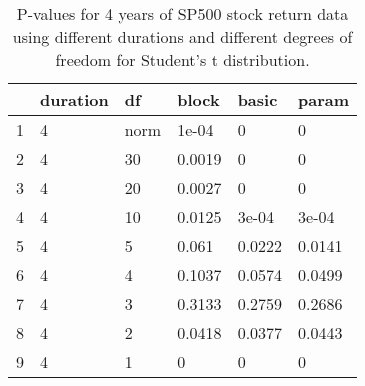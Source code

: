 \begin{table}[ht]
\centering
\caption{P-values for 4 years of SP500 stock return 
                   data using different durations
  and different degrees of freedom for Student's t distribution.} 
\label{table:SP5004}
\begin{tabular}{rlllll}
  \hline
 & duration & df & block & basic & param \\ 
  \hline
1 & 4 & norm & 1e-04 & 0 & 0 \\ 
  2 & 4 & 30 & 0.0019 & 0 & 0 \\ 
  3 & 4 & 20 & 0.0027 & 0 & 0 \\ 
  4 & 4 & 10 & 0.0125 & 3e-04 & 3e-04 \\ 
  5 & 4 & 5 & 0.061 & 0.0222 & 0.0141 \\ 
  6 & 4 & 4 & 0.1037 & 0.0574 & 0.0499 \\ 
  7 & 4 & 3 & 0.3133 & 0.2759 & 0.2686 \\ 
  8 & 4 & 2 & 0.0418 & 0.0377 & 0.0443 \\ 
  9 & 4 & 1 & 0 & 0 & 0 \\ 
   \hline
\end{tabular}
\end{table}

